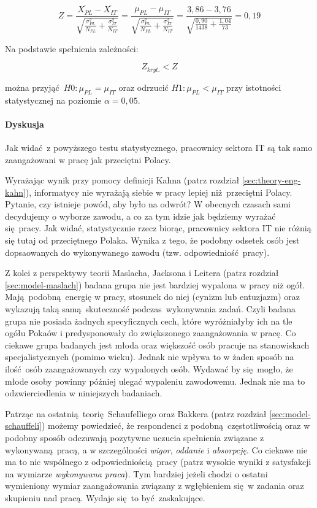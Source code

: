 \begin{equation}
  Z = \frac{\overline{X_{PL}} - \overline{X_{IT}}}{\sqrt{\frac{\sigma^2_{PL}}{N_{PL}}+\frac{\sigma^2_{IT}}{N_{IT}}}} = \frac{\mu_{PL} - \mu_{IT}}{\sqrt{\frac{\sigma^2_{PL}}{N_{PL}}+\frac{\sigma^2_{IT}}{N_{IT}}}} = \frac{3,86- 3,76}{\sqrt{\frac{0,90}{1438}+\frac{1,04}{73}}} = 0,19
\end{equation}

Na podstawie spełnienia zależności:

\begin{equation}
  Z_{kryt.} < Z
\end{equation}

można przyjąć $H0: \mu_{PL} = \mu_{IT}$ oraz odrzucić $H1: \mu_{PL} < \mu_{IT}$ przy istotności statystycznej na poziomie $\alpha = 0,05$.

\paragraph{Dyskusja}
Jak widać z powyższego testu statystycznego, pracownicy sektora IT są tak samo zaangażowani w pracę jak przeciętni Polacy.

Wyrażając wynik przy pomocy definicji Kahna (patrz rozdział \ref{sec:theory-eng-kahn}), informatycy nie wyrażają siebie w pracy lepiej niż przeciętni Polacy. Pytanie, czy istnieje powód, aby było na odwrót? W obecnych czasach sami decydujemy o wyborze zawodu, a co za tym idzie jak będziemy wyrażać się pracy. Jak widać, statystycznie rzecz biorąc, pracownicy sektora IT nie różnią się tutaj od przeciętnego Polaka. Wynika z tego, że podobny odsetek osób jest dopsaowanych do
wykonywanego zawodu (tzw. odpowiedniość pracy).

Z kolei z perspektywy teorii Maslacha, Jacksona i Leitera (patrz rozdział \ref{sec:model-maslach}) badana grupa nie jest bardziej wypalona w pracy niż ogół. Mają podobną energię w pracy, stosunek do niej (cynizm lub entuzjazm) oraz wykazują taką samą skuteczność podczas wykonywania zadań. Czyli badana grupa nie posiada żadnych specyficznych cech, które wyróżniałyby ich na tle ogółu Pokaów i predysponowały do zwiększonego zaangażowania w pracę. Co ciekawe grupa badanych
jest młoda oraz większość osób pracuje na stanowiskach specjalistycznych (pomimo wieku). Jednak nie wpływa to w żaden sposób na
ilość osób zaangażowanych czy wypalonych osób. Wydawać by się mogło, że młode osoby powinny później ulegać wypaleniu zawodowemu. Jednak nie ma to odzwierciedlenia w niniejszych badaniach.

Patrząc na ostatnią teorię Schaufelliego oraz Bakkera (patrz rozdział \ref{sec:model-schauffeli}) możemy powiedzieć, że respondenci z podobną częstotliwością oraz w podobny sposób odczuwają pozytywne uczucia spełnienia związane z wykonywaną pracą, a w szczególności \textit{wigor}, \textit{oddanie} i \textit{absorpcję}. Co ciekawe nie ma to nic wspólnego z odpowiedniością pracy (patrz wysokie wyniki z satysfakcji na wymiarze \textit{wykonywana praca}). Tym bardziej
jeżeli chodzi o ostatni wymieniony wymiar zaangażowania związany z wgłębieniem się w zadania oraz skupieniu nad pracą. Wydaje się to być zaskakujące.
